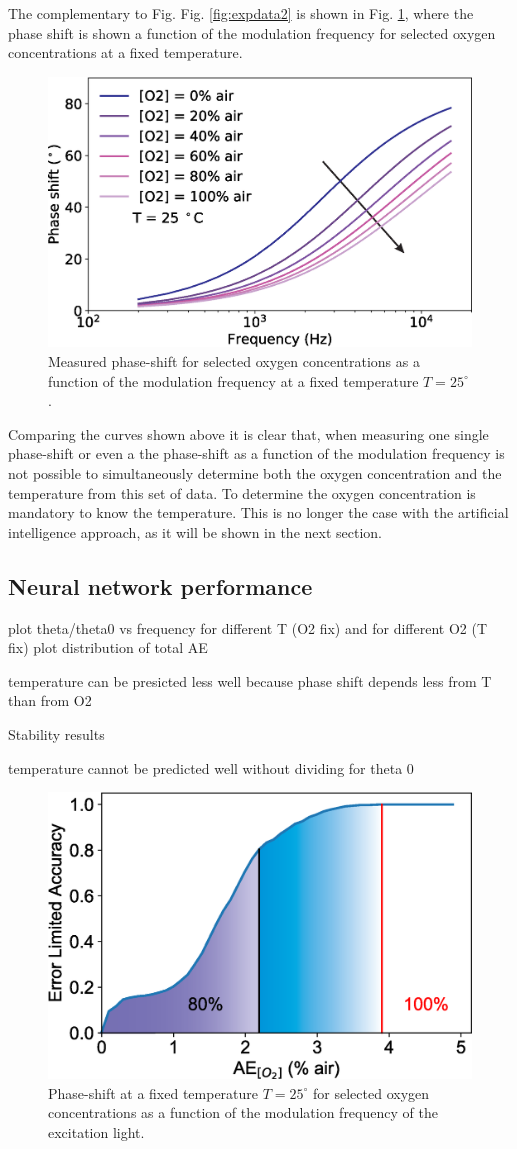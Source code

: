 \documentclass[9pt,twocolumn,twoside,pdftex]{optica}
\begin{document}
The complementary to Fig. Fig. \ref{fig:expdata2} is shown in Fig. \ref{fig:expdata3}, where the phase shift is shown a function of the modulation frequency for selected oxygen concentrations at a fixed temperature.

\begin{figure}[htbp]
\centering
\includegraphics[width=8 cm]{phase_f_O2.eps}
\caption{Measured phase-shift for selected oxygen concentrations as a function of the modulation frequency at a fixed temperature $T=25 ^{\circ}$ .}
\label{fig:expdata3}
\end{figure}

Comparing the curves shown above it is clear that, when measuring one single phase-shift or even a the phase-shift as a function of the modulation frequency is not possible to simultaneously determine both the oxygen concentration and the temperature from this set of data. To determine the oxygen concentration is mandatory to know the temperature. This is no longer the case with the artificial intelligence approach, as it will be shown in the next section. 

\subsection{Neural network performance}

plot theta/theta0 vs frequency for different T (O2 fix) and for different O2 (T fix)
plot distribution of total AE

temperature can be presicted less well because phase shift depends less from T than from O2

Stability results

temperature cannot be predicted well without dividing for theta 0


\begin{figure}[htbp]
\centering
\includegraphics[width=8 cm]{ELA_1.eps}
\caption{Phase-shift at a fixed temperature $T=25 ^{\circ}$ for selected oxygen concentrations as a function of the modulation frequency of the excitation light.}
\label{fig:result_theta0}
\end{figure}
\end{document}

